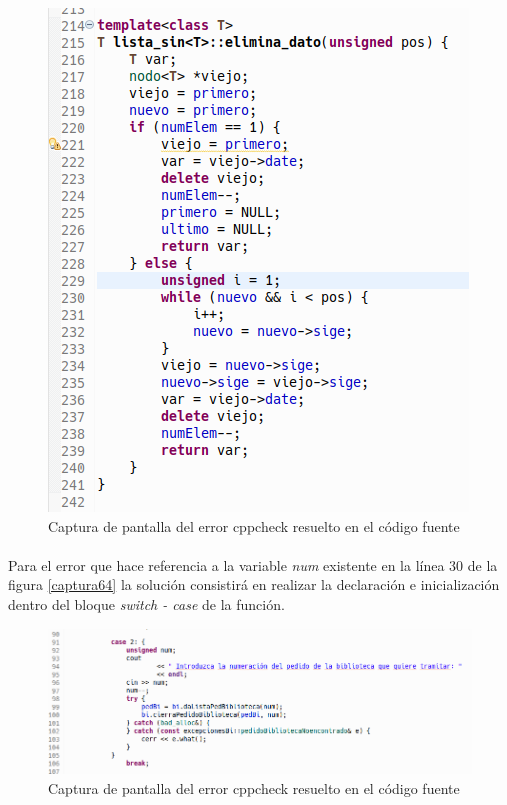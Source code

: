 			\begin{figure}[H]
				\centering
				\includegraphics[scale=0.7]{img/captura78.png}
				\caption{Captura de pantalla del error cppcheck  resuelto en el código fuente}
				\label{captura78}
			\end{figure}
		
			\paragraph{}Para el error que hace referencia a la variable \textit{num} existente en la línea 30 de la figura \ref*{captura64} la solución consistirá en realizar la declaración e inicialización dentro del bloque \textit{switch - case} de la función.
			
			\begin{figure}[H]
				\centering
				\includegraphics[scale=0.5]{img/captura79.png}
				\caption{Captura de pantalla del error cppcheck  resuelto en el código fuente}
				\label{captura79}
			\end{figure}
		
